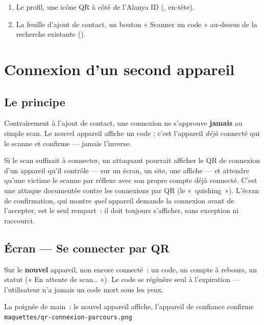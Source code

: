 \begin{enumerate}[leftmargin=1.6em]
  \item Le profil, une icône QR à côté de l'Alanya ID
        (, en-tête).
  \item La feuille d'ajout de contact, un bouton « Scanner un code » au-dessus de la
        recherche existante ().
\end{enumerate}

\chapter{Connexion d'un second appareil}
\label{ch:qr-naif-connexion}

\section{Le principe}

Contrairement à l'ajout de contact, une connexion ne s'approuve \textbf{jamais} au simple
scan. Le nouvel appareil affiche un code ; c'est l'appareil \emph{déjà} connecté qui le
scanne et confirme --- jamais l'inverse.

\begin{alerte}
Si le scan suffisait à connecter, un attaquant pourrait afficher le QR de connexion d'un
appareil qu'il contrôle --- sur un écran, un site, une affiche --- et attendre qu'une
victime le scanne par réflexe avec son propre compte déjà connecté. C'est une attaque
documentée contre les connexions par QR (le «~quishing~»). L'écran de confirmation, qui
montre \emph{quel} appareil demande la connexion avant de l'accepter, est le seul rempart~:
il doit toujours s'afficher, sans exception ni raccourci.
\end{alerte}

\section{Écran --- Se connecter par QR}

Sur le \textbf{nouvel} appareil, non encore connecté~: un code, un compte à rebours, un
statut (« En attente de scan… »). Le code se régénère seul à l'expiration --- l'utilisateur
n'a jamais un code mort sous les yeux.

\begin{center}
    {La poignée de main~: le nouvel appareil affiche, l'appareil de confiance confirme\\
     \texttt{maquettes/qr-connexion-parcours.png}}
\end{center}

